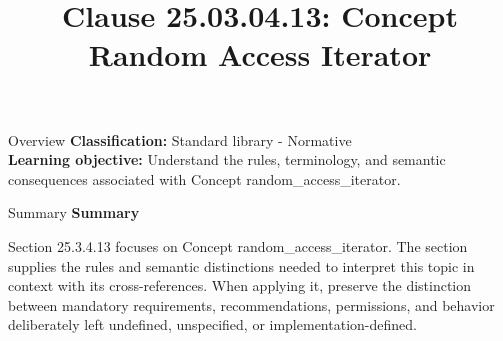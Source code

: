 \documentclass[10pt,letterpaper]{article}
\title{Clause 25.03.04.13: Concept Random Access Iterator}
\author{}
\date{}
\begin{document}
\maketitle
\begin{CornellOverviewBox}{Overview}
\textbf{Classification:} Standard library - Normative\\[2pt]
\textbf{Learning objective:} Understand the rules, terminology, and semantic consequences associated with Concept random\_access\_iterator.
\end{CornellOverviewBox}\begin{CornellSummaryBox}{Summary}
{\sffamily\bfseries\color{Accent} Summary}\par\vspace{3pt}Section 25.3.4.13 focuses on Concept random\_access\_iterator. The section supplies the rules and semantic distinctions needed to interpret this topic in context with its cross-references. When applying it, preserve the distinction between mandatory requirements, recommendations, permissions, and behavior deliberately left undefined, unspecified, or implementation-defined.
\end{CornellSummaryBox}
\end{document}
